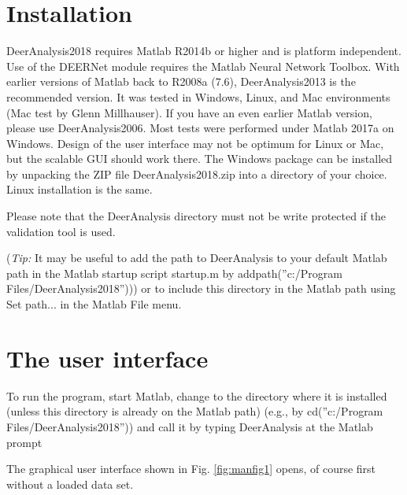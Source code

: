 \documentclass{article}
\begin{document}
\section{Installation}
\label{install}

DeerAnalysis2018 requires Matlab R2014b or higher and is platform independent. Use of the DEERNet module requires the Matlab Neural Network Toolbox. With earlier versions of Matlab back to R2008a (7.6), DeerAnalysis2013 is the recommended version. It was tested in Windows, Linux, and Mac
environments (Mac test by Glenn Millhauser). If you have an even earlier Matlab version, please use DeerAnalysis2006. Most tests were performed under Matlab 2017a on Windows. Design of the user interface may not be optimum for Linux or Mac, but the scalable GUI should work there. The
Windows package can be installed by unpacking the ZIP file DeerAnalysis2018.zip into a directory of your choice. Linux installation is the same. 

Please note that the DeerAnalysis directory must not be write protected if the validation tool is used.

({\em Tip:} It may be useful to add the path to DeerAnalysis to your default Matlab path in the Matlab startup script {\ttfamily startup.m} by {\ttfamily addpath(''c:/Program Files/DeerAnalysis2018''))}) or to include this directory in the Matlab path using {\ttfamily Set path...} in the Matlab File menu.

\section{The user interface}
\label{features}

To run the program, start Matlab, change to the directory where it is installed (unless this directory is already on the Matlab path)
(e.g., by {\ttfamily cd(''c:/Program Files/DeerAnalysis2018''))} and call it by typing
{\ttfamily DeerAnalysis} at the Matlab prompt  

The graphical user interface shown in Fig. \ref{fig:manfig1} opens, of course first without a loaded data set.
\end{document}
